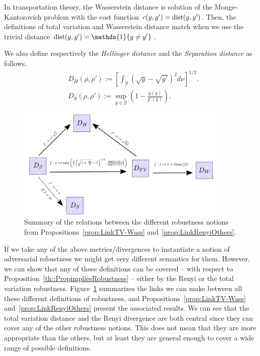 \begin{rmq}
In transportation theory, the Wasserstein distance is solution of the Monge-Kantorovich problem with the cost function $c(y,y') = \operatorname{dist}(y,y')$. Then, the definitions of total variation and Wasserstein distance match when we use the trivial distance $\dist(y,y') = \mathds{1}\{y \neq y'\}$. 
\end{rmq}

We also define respectively the \emph{Hellinger distance} and the \emph{Separation distance} as follows.
\begin{align}
    & D_{H}(\rho  , \rho'):= \left[ \int_{\mathcal{Y}} \left(\sqrt{g} - \sqrt{g'} \right)^{2} d \nu \right]^{1/2}.\\
    & D_{S}(\rho  , \rho'):= \sup\limits_{y \in \mathcal{Y}} \left( 1 - \frac{g(y)}{g'(y)} \right). 
\end{align}

\begin{figure}
    \centering
    \includegraphics[width=0.9\textwidth]{sections/appendix/mlj_rando/images/DiagramProp67.pdf}
    \caption{Summary of the relations between the different robustness notions from Propositions~\ref{prop:LinkTV-Wass} and~\ref{prop:LinkRenyiOthers}. }
    \label{fig:Proposition67}
\end{figure}

If we take any of the above metrics/divergences to instantiate a notion of adversarial robustness we might get very different semantics for them. However, we can show that any of these definitions can be covered -- with respect to Proposition~\ref{th::PropimpliesRobustness} -- either by the Renyi or the total variation robustness. 
Figure~\ref{fig:Proposition67} summarizes the links we can make between all these different definitions of robustness, and Propositions~\ref{prop:LinkTV-Wass} and~\ref{prop:LinkRenyiOthers} present the associated results. We can see that the total variation distance and the Renyi divergence are both central since they can cover any of the other robustness notions. This does not mean that they are more appropriate than the others, but at least they are general enough to cover a wide range of possible definitions.

